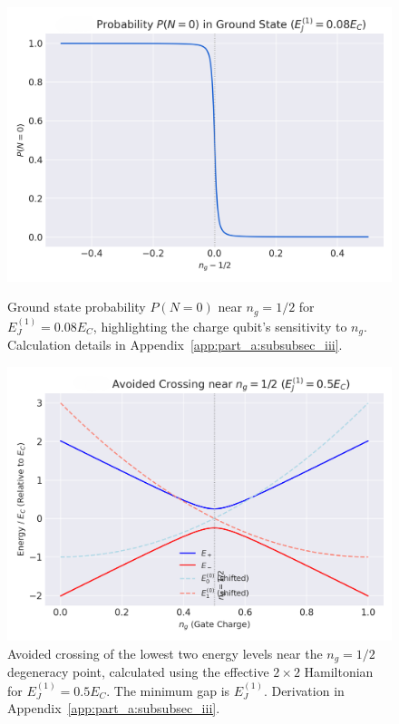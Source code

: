 \documentclass[12pt]{article}
\begin{document}
\begin{figure}[htbp]
    \begin{minipage}[t]{0.48\textwidth}
        \centering
        \includegraphics[width=\textwidth]{fig_charge_prob.png}
        \caption{Ground state probability $P(N=0)$ near $n_g=1/2$ for $E_J^{(1)} = 0.08 E_C$, highlighting the charge qubit's sensitivity to $n_g$. Calculation details in Appendix~\ref{app:part_a:subsubsec_iii}.}
        \label{fig:charge_prob}
    \end{minipage}
    \hfill
    \begin{minipage}[t]{0.48\textwidth}
        \centering
        \includegraphics[width=\textwidth]{fig_avoid_crossing.png}
        \caption{Avoided crossing of the lowest two energy levels near the $n_g = 1/2$ degeneracy point, calculated using the effective $2 \times 2$ Hamiltonian for $E_J^{(1)} = 0.5 E_C$. The minimum gap is $E_J^{(1)}$. Derivation in Appendix~\ref{app:part_a:subsubsec_iii}.}
        \label{fig:avoid_crossing}
    \end{minipage}
\end{figure}
\end{document}
